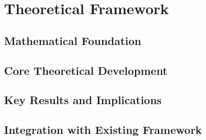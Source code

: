 
\section{Theoretical Framework}

\subsection{Mathematical Foundation}

\subsection{Core Theoretical Development}

\subsection{Key Results and Implications}

\subsection{Integration with Existing Framework}
